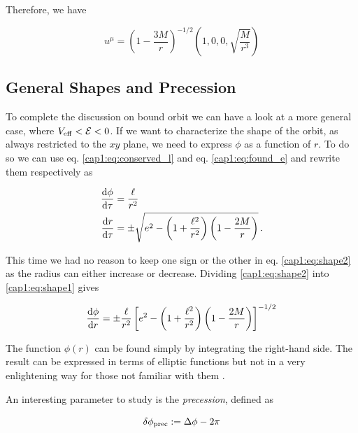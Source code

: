 Therefore, we have

\begin{equation}
    u^\mu = \left( 1 - \frac{3M}{r} \right)^{-1/2}
    \left( 1, 0, 0, \sqrt{\frac{M}{r^3}} \right)
\end{equation}


\subsection{General Shapes and Precession}
\label{cap1:sec:precession}

To complete the discussion on bound orbit we can have a look at a more general
case, where $V_{\rm eff} < \mathcal E < 0$.
If we want to characterize the shape of the orbit, as always restricted to the
$xy$ plane, we need to express $\phi$ as a function of $r$.
To do so we can use eq. \ref{cap1:eq:conserved_l} and eq. \ref{cap1:eq:found_e}
and rewrite them respectively as

\begin{subequations}
\begin{align}
    \dv{\phi}{\tau} &= \frac{\ell}{r^2} \label{cap1:eq:shape1} \\
    \dv{r}{\tau} &= \pm \sqrt{e^2 - \left(1 + \frac{\ell^2}{r^2}\right)
    \left(1 - \frac{2M}{r}\right)} \label{cap1:eq:shape2} \, .
\end{align}
\label{cap1:eq:to_find_shape}
\end{subequations}

This time we had no reason to keep one sign or the other in eq.
\ref{cap1:eq:shape2} as the radius can either increase or decrease.
Dividing \ref{cap1:eq:shape2} into \ref{cap1:eq:shape1} gives

\begin{equation}
    \dv{\phi}{r} = \pm \frac{\ell}{r^2}
    \left[e^2 - \left(1 + \frac{\ell^2}{r^2}\right)
    \left(1 - \frac{2M}{r}\right)\right]^{-1/2}
    \label{cap1:eq:shape}
\end{equation}

The function $\phi(r)$ can be found simply by integrating the right-hand side.
The result can be expressed in terms of elliptic functions but not in a very
enlightening way for those not familiar with them
\cite[page 202]{hartle2021gravity}.

An interesting parameter to study is the \textit{precession}, defined as

\begin{equation}
    \delta \phi_{\rm prec} := \Delta \phi - 2 \pi
    \label{cap1:eq:precession}
\end{equation}

